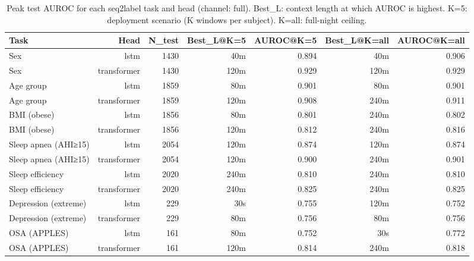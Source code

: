 \begin{table}[ht]
\centering
\caption{Peak test AUROC for each seq2label task and head (channel: full). Best\_L: context length at which AUROC is highest. K=5: deployment scenario (K windows per subject). K=all: full-night ceiling.}
\label{tab:peak_auroc_full}
\begin{tabular}{lrrrrrr}
\toprule
Task & Head & N_test & Best_L@K=5 & AUROC@K=5 & Best_L@K=all & AUROC@K=all \\
\midrule
Sex & lstm & 1430 & 40m & 0.894 & 40m & 0.906 \\
Sex & transformer & 1430 & 120m & 0.929 & 120m & 0.929 \\
Age group & lstm & 1859 & 80m & 0.901 & 80m & 0.901 \\
Age group & transformer & 1859 & 120m & 0.908 & 240m & 0.911 \\
BMI (obese) & lstm & 1856 & 80m & 0.801 & 240m & 0.802 \\
BMI (obese) & transformer & 1856 & 120m & 0.812 & 240m & 0.816 \\
Sleep apnea (AHI≥15) & lstm & 2054 & 120m & 0.874 & 120m & 0.874 \\
Sleep apnea (AHI≥15) & transformer & 2054 & 120m & 0.900 & 240m & 0.901 \\
Sleep efficiency & lstm & 2020 & 240m & 0.810 & 240m & 0.810 \\
Sleep efficiency & transformer & 2020 & 240m & 0.825 & 240m & 0.825 \\
Depression (extreme) & lstm & 229 & 30s & 0.755 & 120m & 0.752 \\
Depression (extreme) & transformer & 229 & 80m & 0.756 & 80m & 0.756 \\
OSA (APPLES) & lstm & 161 & 80m & 0.752 & 30s & 0.772 \\
OSA (APPLES) & transformer & 161 & 120m & 0.814 & 240m & 0.818 \\
\bottomrule
\end{tabular}
\end{table}